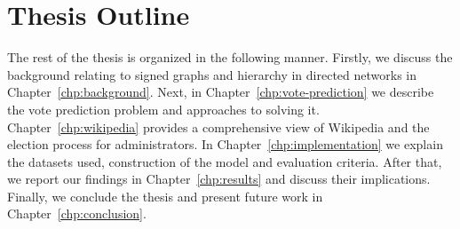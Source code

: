 \section{Thesis Outline}
The rest of the thesis is organized in the following manner. Firstly, we discuss the background relating to signed graphs and hierarchy in directed networks in Chapter~\ref{chp:background}. Next, in Chapter~\ref{chp:vote-prediction} we describe the vote prediction problem and approaches to solving it. Chapter~\ref{chp:wikipedia} provides a comprehensive view of Wikipedia and the election process for administrators. In Chapter~\ref{chp:implementation} we explain the datasets used, construction of the model and evaluation criteria. After that, we report our findings in Chapter~\ref{chp:results} and discuss their implications. Finally, we conclude the thesis and present future work in Chapter~\ref{chp:conclusion}.
